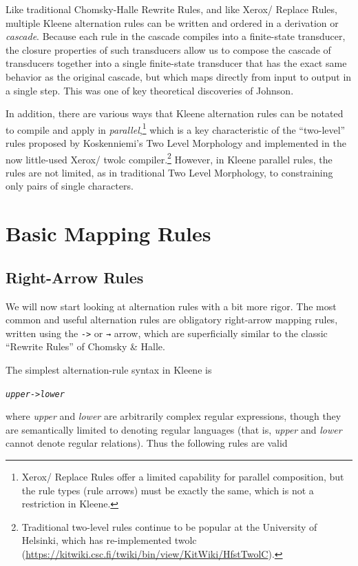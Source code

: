 Like traditional Chomsky-Halle Rewrite Rules, and like Xerox/ Replace Rules,
multiple Kleene alternation rules can be written and ordered in a derivation or
\emph{cascade}.  Because each rule in the cascade compiles into a finite-state transducer,
the closure properties of such transducers allow us to compose the cascade of transducers
together into a single finite-state transducer that has the exact same behavior as the
original cascade, but which maps directly from input to output in a single step.  This
was one of key theoretical discoveries of Johnson.

In addition, there are various ways that Kleene alternation rules can be notated to
compile and apply in \emph{parallel},\footnote{Xerox/ Replace Rules offer a
limited capability for parallel composition, but the rule types (rule arrows) must be
exactly the same, which is not a restriction in Kleene.}  which is a key characteristic
of the ``two-level'' rules proposed by Koskenniemi's Two Level Morphology and implemented
in the now little-used Xerox/ twolc compiler.\footnote{Traditional two-level
rules continue to be popular at the University of Helsinki, which has re-implemented
twolc (\url{https://kitwiki.csc.fi/twiki/bin/view/KitWiki/HfstTwolC}).}  However, in Kleene parallel rules, the rules are not limited, as in traditional
Two Level Morphology, to constraining only pairs of single characters.

\section{Basic Mapping Rules}

\subsection{Right-Arrow Rules}

We will now start looking at alternation rules with a bit more rigor.  
The most common and useful alternation rules are obligatory right-arrow mapping rules, written using
the \texttt{->} or \texttt{→} arrow, which are
superficially similar to the classic ``Rewrite Rules'' of Chomsky \& Halle.

The simplest alternation-rule syntax in Kleene is

\begin{alltt}
\emph{upper} -> \emph{lower}
\end{alltt}

\noindent
where \emph{upper} and \emph{lower} are
arbitrarily complex regular expressions, though they are semantically limited to
denoting regular languages (that is, \emph{upper} and \emph{lower} cannot denote regular relations).
Thus the following rules are valid


